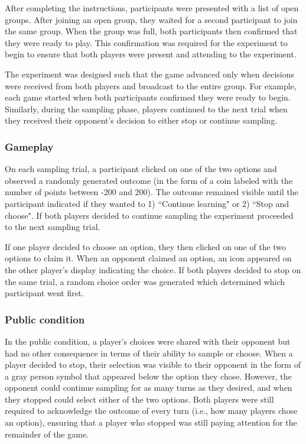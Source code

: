 \documentclass[11pt,jou]{apa6}
\begin{document}
After completing the instructions, participants were presented with a list of open groups.
After joining an open group, they waited for a second participant to join the same group. 
When the group was full, both participants then confirmed that they were ready to play.
This confirmation was required for the experiment to begin to ensure that both players were present and attending to the experiment.

The experiment was designed such that the game advanced only when decisions were received from both players and broadcast to the entire group. 
For example, each game started when both participants confirmed they were ready to begin.
Similarly, during the sampling phase, players continued to the next trial when they received their opponent's decision to either stop or continue sampling.

\subsubsection{Gameplay}

On each sampling trial, a participant clicked on one of the two options and observed a randomly generated outcome (in the form of a coin labeled with the number of points between -200 and 200). 
The outcome remained visible until the participant indicated if they wanted to 1) ``Continue learning" or 2) ``Stop and choose". 
If both players decided to continue sampling the experiment proceeded to the next sampling trial.

If one player decided to choose an option, they then clicked on one of the two options to claim it. 
When an opponent claimed an option, an icon appeared on the other player's display indicating the choice. 
If both players decided to stop on the same trial, a random choice order was generated which determined which participant went first.

\subsubsection{Public condition}

In the public condition, a player's choices were shared with their opponent but had no other consequence in terms of their ability to sample or choose.
When a player decided to stop, their selection was visible to their opponent in the form of a gray person symbol that appeared below the option they chose. 
However, the opponent could continue sampling for as many turns as they desired, and when they stopped could select either of the two options.
Both players were still required to acknowledge the outcome of every turn (i.e., how many players chose an option), ensuring that a player who stopped was still paying attention for the remainder of the game.
\end{document}
